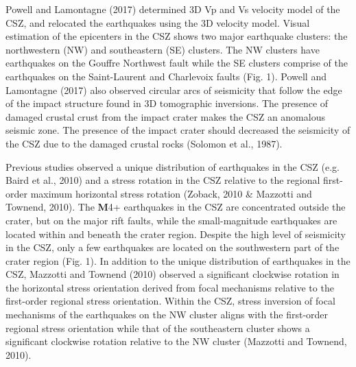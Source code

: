 \documentclass[draft]{agujournal2018}
\begin{document}
Powell and Lamontagne (2017) determined 3D Vp and Vs velocity model of the CSZ, and relocated the earthquakes using the 3D velocity model. Visual estimation of the epicenters in the CSZ shows two major earthquake clusters: the northwestern (NW) and southeastern (SE) clusters. The NW clusters have earthquakes on the Gouffre Northwest fault while the SE clusters comprise of the earthquakes on the Saint-Laurent and Charlevoix faults (Fig. 1). Powell and Lamontagne (2017) also observed circular arcs of seismicity that follow the edge of the impact structure found in 3D tomographic inversions. The presence of damaged crustal crust from the impact crater makes the CSZ an anomalous seismic zone. The presence of the impact crater should decreased the seismicity of the CSZ due to the damaged crustal rocks (Solomon et al., 1987).

Previous studies observed a unique distribution of earthquakes in the CSZ (e.g. Baird et al., 2010) and a stress rotation in the CSZ relative to the regional first-order maximum horizontal stress rotation (Zoback, 2010 & Mazzotti and Townend, 2010). The \textbf{M}4+ earthquakes in the CSZ are concentrated outside the crater, but on the major rift faults, while the small-magnitude earthquakes are located within and beneath the crater region. Despite the high level of seismicity in the CSZ, only a few earthquakes are located on the southwestern part of the crater region (Fig. 1). In addition to the unique distribution of earthquakes in the CSZ, Mazzotti and Townend (2010) observed a significant clockwise rotation in the horizontal stress orientation derived from focal mechanisms relative to the first-order regional stress orientation. Within the CSZ, stress inversion of focal mechanisms of the earthquakes on the NW cluster aligns with the first-order regional stress orientation while that of the southeastern cluster shows a significant clockwise rotation relative to the NW cluster (Mazzotti and Townend, 2010).


\end{document}
